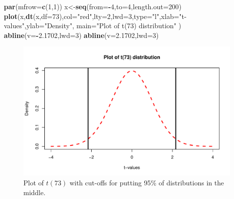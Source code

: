 \documentclass[]{book}
\newenvironment{Shaded}{\begin{snugshade}}{\end{snugshade}}
\newcommand{\KeywordTok}[1]{\textcolor[rgb]{0.13,0.29,0.53}{\textbf{#1}}}
\newcommand{\DataTypeTok}[1]{\textcolor[rgb]{0.13,0.29,0.53}{#1}}
\newcommand{\DecValTok}[1]{\textcolor[rgb]{0.00,0.00,0.81}{#1}}
\newcommand{\FloatTok}[1]{\textcolor[rgb]{0.00,0.00,0.81}{#1}}
\newcommand{\StringTok}[1]{\textcolor[rgb]{0.31,0.60,0.02}{#1}}
\newcommand{\OperatorTok}[1]{\textcolor[rgb]{0.81,0.36,0.00}{\textbf{#1}}}
\newcommand{\NormalTok}[1]{#1}
\theoremstyle{definition}
\theoremstyle{definition}
\theoremstyle{remark}
\begin{document}
\begin{Shaded}
\begin{Highlighting}[]
\KeywordTok{par}\NormalTok{(}\DataTypeTok{mfrow=}\KeywordTok{c}\NormalTok{(}\DecValTok{1}\NormalTok{,}\DecValTok{1}\NormalTok{))}
\NormalTok{x<-}\KeywordTok{seq}\NormalTok{(}\DataTypeTok{from=}\OperatorTok{-}\DecValTok{4}\NormalTok{,}\DataTypeTok{to=}\DecValTok{4}\NormalTok{,}\DataTypeTok{length.out=}\DecValTok{200}\NormalTok{)}
\KeywordTok{plot}\NormalTok{(x,}\KeywordTok{dt}\NormalTok{(x,}\DataTypeTok{df=}\DecValTok{73}\NormalTok{),}\DataTypeTok{col=}\StringTok{"red"}\NormalTok{,}\DataTypeTok{lty=}\DecValTok{2}\NormalTok{,}\DataTypeTok{lwd=}\DecValTok{3}\NormalTok{,}\DataTypeTok{type=}\StringTok{"l"}\NormalTok{,}\DataTypeTok{xlab=}\StringTok{"t-values"}\NormalTok{,}\DataTypeTok{ylab=}\StringTok{"Density"}\NormalTok{,}
     \DataTypeTok{main=}\StringTok{"Plot of t(73) distribution"}\NormalTok{ )}
\KeywordTok{abline}\NormalTok{(}\DataTypeTok{v=}\OperatorTok{-}\FloatTok{2.1702}\NormalTok{,}\DataTypeTok{lwd=}\DecValTok{3}\NormalTok{)}
\KeywordTok{abline}\NormalTok{(}\DataTypeTok{v=}\FloatTok{2.1702}\NormalTok{,}\DataTypeTok{lwd=}\DecValTok{3}\NormalTok{)}
\end{Highlighting}
\end{Shaded}

\begin{figure}
\centering
\includegraphics{02-reintroductionToStatistics_files/figure-latex/Figure2-20-1.pdf}
\caption{\label{fig:Figure2-20}Plot of \(t(73)\) with cut-offs for putting 95\% of
distributions in the middle.}
\end{figure}
\end{document}

